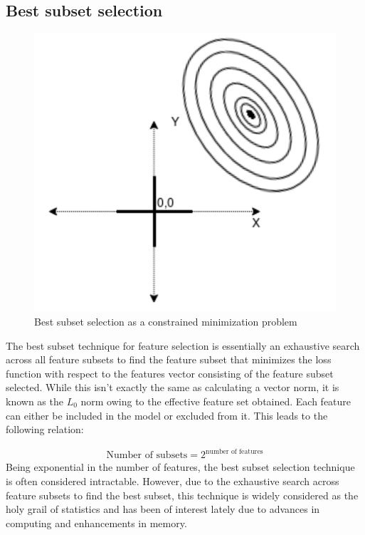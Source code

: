 \documentclass[a4paper,12pt]{article}
\begin{document}
\subsection{Best subset selection}

\begin{figure}[H]
    \centering
    \includegraphics[scale=0.4]{best-subset.png}
    \caption{Best subset selection as a constrained minimization problem}
    \label{fig:ALAMO Flowchart}
\end{figure}

The best subset technique for feature selection is essentially an exhaustive search across all feature subsets to find the feature subset that minimizes the loss function with respect to the features vector consisting of the feature subset selected. While this isn't exactly the same as calculating a vector norm, it is known as the $L_0$ norm owing to the effective feature set obtained. Each feature can either be included in the model or excluded from it. This leads to the following relation:

\begin{eqnarray}
\textrm{Number of subsets} = 2^{\textrm{number of features}}
\end{eqnarray}
Being exponential in the number of features, the best subset selection technique is often considered intractable. However, due to the exhaustive search across feature subsets to find the best subset, this technique is widely considered as the holy grail of statistics and has been of interest lately due to advances in computing and enhancements in memory.
\end{document}
